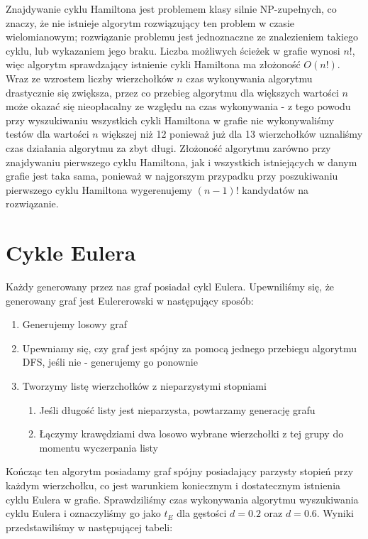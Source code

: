 \documentclass{article}
\begin{document}
Znajdywanie cyklu Hamiltona jest problemem klasy silnie NP-zupełnych, co znaczy, że nie istnieje algorytm rozwiązujący ten problem w czasie wielomianowym; rozwiązanie problemu jest jednoznaczne ze znalezieniem takiego cyklu, lub wykazaniem jego braku. Liczba możliwych ścieżek w grafie wynosi $n!$, więc algorytm sprawdzający istnienie cykli Hamiltona ma złożoność $O(n!)$. Wraz ze wzrostem liczby wierzchołków $n$ czas wykonywania algorytmu drastycznie się zwiększa, przez co przebieg algorytmu dla większych wartości $n$ może okazać się nieopłacalny ze względu na czas wykonywania - z tego powodu przy wyszukiwaniu wszystkich cykli Hamiltona w grafie nie wykonywaliśmy testów dla wartości $n$ większej niż 12 ponieważ już dla 13 wierzchołków uznaliśmy czas działania algorytmu za zbyt długi. Złożoność algorytmu zarówno przy znajdywaniu pierwszego cyklu Hamiltona, jak i wszystkich istniejących w danym grafie jest taka sama, ponieważ w najgorszym przypadku przy poszukiwaniu pierwszego cyklu Hamiltona wygerenujemy $(n-1)!$ kandydatów na rozwiązanie.

\section{Cykle Eulera}

Każdy generowany przez nas graf posiadał cykl Eulera. Upewniliśmy się, że generowany graf jest Eulererowski w następujący sposób:

\begin{enumerate}
	\item Generujemy losowy graf
	\item Upewniamy się, czy graf jest spójny za pomocą jednego przebiegu algorytmu DFS, jeśli nie - generujemy go ponownie
	\item Tworzymy listę wierzchołków z nieparzystymi stopniami
	\begin{enumerate}
		\item Jeśli długość listy jest nieparzysta, powtarzamy generację grafu
		\item Łączymy krawędziami dwa losowo wybrane wierzchołki z tej grupy do momentu wyczerpania listy
	\end{enumerate}
\end{enumerate}

Kończąc ten algorytm posiadamy graf spójny posiadający parzysty stopień przy każdym wierzchołku, co jest warunkiem koniecznym i dostatecznym istnienia cyklu Eulera w grafie. Sprawdziliśmy czas wykonywania algorytmu wyszukiwania cyklu Eulera i oznaczyliśmy go jako $t_E$ dla gęstości $d=0.2$ oraz $d=0.6$. Wyniki przedstawiliśmy w następującej tabeli:
\end{document}
